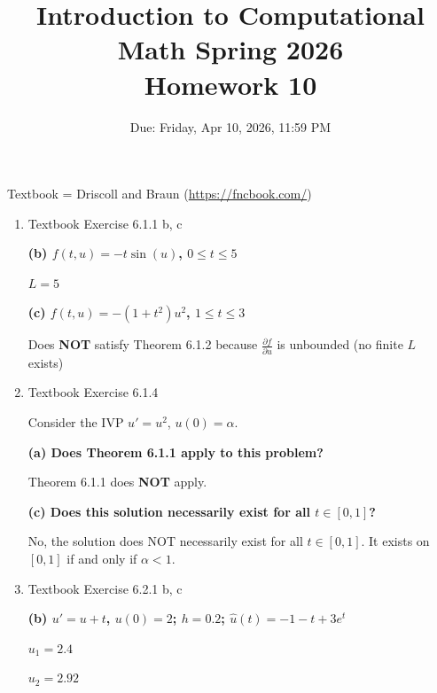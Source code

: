 \documentclass[reqno, answers]{exam}
\title{Introduction to Computational Math Spring 2026 \\ Homework 10}
\date{Due: Friday, Apr 10, 2026, 11:59 PM}
\author{}
\begin{document}
\maketitle
\thispagestyle{empty}

Textbook = Driscoll and Braun (\url{https://fncbook.com/})

\begin{enumerate}

  \item Textbook Exercise 6.1.1 b, c

        \begin{solution}
          \textbf{(b) $f(t,u) = -t\sin(u)$, $0 \leq t \leq 5$}

          $\boxed{L = 5}$

          \medskip

          \textbf{(c) $f(t,u) = -(1+t^2)u^2$, $1 \leq t \leq 3$}

          Does \textbf{NOT} satisfy Theorem 6.1.2 because $\frac{\partial f}{\partial u}$ is unbounded (no finite $L$ exists)

        \end{solution}


  \item Textbook Exercise 6.1.4
        \begin{solution}
          Consider the IVP $u' = u^2$, $u(0) = \alpha$.

          \medskip

          \textbf{(a) Does Theorem 6.1.1 apply to this problem?}

          Theorem 6.1.1 does \textbf{NOT} apply.

          \medskip

          \textbf{(c) Does this solution necessarily exist for all $t \in [0,1]$?}

          No, the solution does NOT necessarily exist for all $t \in [0,1]$. It exists on $[0,1]$ if and only if $\alpha < 1$.

        \end{solution}

  \item Textbook Exercise 6.2.1 b, c
        \begin{solution}

          \textbf{(b) $u' = u + t$, $u(0) = 2$; $h = 0.2$; $\hat{u}(t) = -1 - t + 3e^t$}

          $u_1 = 2.4$

          $u_2 = 2.92$


\end{solution}
\end{enumerate}
\end{document}
